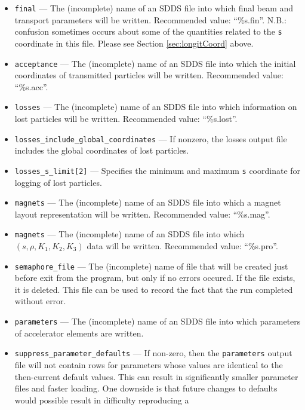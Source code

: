 \documentclass[11pt]{article}
\begin{document}
\begin{itemize}
These use the same conventions and column names as the \verb|-coupled| output of
\verb|sddsanalyzebeam|.  The longitudinal plane uses $s$ in meters (see Section
\ref{sec:longitCoord}); default is 0 (off), leaving the file format unchanged.
\item \verb|final| --- The (incomplete) name of an SDDS file into
which final beam and transport parameters will be written. Recommended
value: ``\%s.fin''.   N.B.: confusion sometimes occurs about some of the quantities related to
the {\tt s} coordinate in this file.  Please see Section \ref{sec:longitCoord} above.
\item \verb|acceptance| --- The (incomplete) name of an SDDS file into
which the initial coordinates of transmitted particles will be
written.  Recommended value: ``\%s.acc''.
\item \verb|losses| --- The (incomplete) name of an SDDS file into
which information on lost particles will be written. Recommended
value: ``\%s.lost''.
\item \verb|losses_include_global_coordinates| --- If nonzero, the losses output file includes the
  global coordinates of lost particles.
\item \verb|losses_s_limit[2]| --- Specifies the minimum and maximum \verb|s| coordinate for
  logging of lost particles.
\item \verb|magnets| --- The (incomplete) name of an SDDS file into
which a magnet layout representation will be written.  Recommended
value: ``\%s.mag''.
\item \verb|magnets| --- The (incomplete) name of an SDDS file into
which $(s, \rho, K_1, K_2, K_3)$ data will be written.  Recommended
value: ``\%s.pro''.
\item \verb|semaphore_file| --- The (incomplete) name of file that
will be created just before exit from the program, but only if no
errors occured.  If the file exists, it is deleted.  This file can be
used to record the fact that the run completed without error.
\item \verb|parameters| --- The (incomplete) name of an SDDS file into
which parameters of accelerator elements are written.
\item \verb|suppress_parameter_defaults| --- If non-zero, then the \verb|parameters| output file
  will not contain rows for parameters whose values are identical to the then-current default values.
  This can result in significantly smaller parameter files and faster loading.
  One downside is that future changes to defaults would possible result in difficulty reproducing a

\end{itemize}
\end{document}
